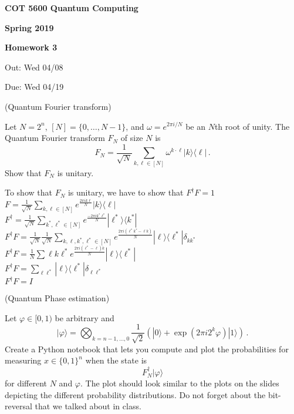 \documentclass[12pt]{article}
\renewcommand{\>}{\rangle}
\newcommand{\<}{\langle}
\begin{document}
\begin{center}
{\bf COT 5600 Quantum Computing} 

{\bf Spring 2019}

\bigskip

{\bf Homework 3}
\end{center}

\bigskip
Out: Wed 04/08

\bigskip
Due: Wed 04/19


\newpage


 (Quantum Fourier transform)

\medskip
\noindent
Let $N=2^n$, $[N]=\{0,\ldots,N-1\}$, and $\omega=e^{2\pi i / N}$ be an $N$th root of unity. The Quantum Fourier transform $F_N$ of size $N$ is 
\[
F_N = \frac{1}{\sqrt{N}} \sum_{k,\ell\in[N]} \omega^{k\cdot \ell} |k\>\<\ell|\,.
\]
Show that $F_N$ is unitary.

\medskip
\noindent
To show that  $F_N$ is unitary, we have to show that $F^\dagger F = 1$ \\
$F = \frac{1}{\sqrt{N}} \sum\limits_{k,\ell \in[N]} e^\frac{2\pi i k \ell}{N} |k\>\<\ell| $ \\
$F^\dagger = \frac{1}{\sqrt{N}} \sum\limits_{k^*,\ell^* \in[N]} e^\frac{-2\pi i k^* \ell^*}{N} |\ell^*\>\<k^*| $ \\
$F^\dagger F = \frac{1}{\sqrt{N}}\frac{1}{\sqrt{N}} \sum\limits_{k,\ell, k^*,\ell^*\in[N]} e^\frac{2 \pi i (\ell^* k^* - \ell k)}{N} |\ell\>\<\ell^*| \delta_{k k^*}$ \\
$F^\dagger F = \frac{1}{N} \sum\limits{\ell k \ell^*} e^\frac{2 \pi i (\ell^* - \ell) k}{N}  |\ell\>\<\ell^*|$ \\
$F^\dagger F = \sum\limits_{\ell \ell^*}  |\ell\>\<\ell^*| \delta_{\ell \ell^*}$ \\
$F^\dagger F = I$



\newpage
{} (Quantum Phase estimation)

\medskip
\noindent
Let $\varphi\in[0,1)$ be arbitrary and
\[
|\varphi\> = \bigotimes_{k=n-1,\ldots,0} \frac{1}{\sqrt{2}} \left(  |0\> + \exp(2\pi i 2^k \varphi) |1\> \right) \,.
\]
Create a Python notebook that lets you compute and plot the probabilities for measuring $x\in\{0,1\}^n$ when the state is
\[
F_N^\dagger |\varphi\>
\]
for different $N$ and $\varphi$.  The plot should look similar to the plots on the slides depicting the different probability distributions.  Do not forget about the bit-reversal that we talked about in class.
\end{document}
